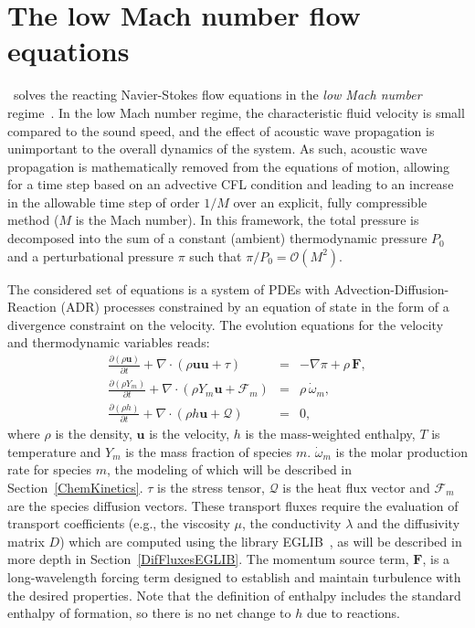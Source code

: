 \section{The low Mach number flow equations}
\newcommand{\etal}{{\it et al.}}

\pelelm\ solves the reacting Navier-Stokes flow equations in the \emph{low Mach number} regime~\cite{DayBell:2000,rehm1978equations,Majda:1985}. In the low Mach number regime, the characteristic fluid velocity is small compared to the sound speed, and the effect of acoustic wave propagation is unimportant to the overall dynamics of the system. As such, acoustic wave propagation is mathematically removed from the equations of motion, allowing for a time step based on an advective CFL condition and leading to an increase in the allowable time step of order $1/M$ over an explicit, fully compressible method ($M$ is the Mach number). In this framework, the total pressure is decomposed into the sum of a constant (ambient) thermodynamic pressure $P_0$ and a perturbational pressure $\pi$ such that $\pi/P_0 = \mathcal{O} (M^2)$. 

The considered set of equations is a system of PDEs with Advection-Diffusion-Reaction (ADR) processes constrained by an equation of state in the form of a divergence constraint on the velocity. The evolution equations for the velocity and thermodynamic variables reads:
\begin{eqnarray}
\frac{\partial (\rho \boldsymbol{u})}{\partial t} + 
\nabla \cdot \left(\rho  \boldsymbol{u} \boldsymbol{u} + \tau \right)
&=& -\nabla \pi + \rho \, \boldsymbol{F}  ,
\label{eq:mom}
\\
\frac{\partial (\rho Y_m)}{\partial t} +
\nabla \cdot \left( \rho Y_m \boldsymbol{u} + \boldsymbol{\mathcal{F}}_{m} \right)
&=& \rho \, \dot{\omega}_m,
\label{eq:species}
\\
\frac{ \partial (\rho h)}{ \partial t} +
\nabla \cdot \left( \rho h \boldsymbol{u} + \boldsymbol{\mathcal{Q}} \right) &=& 0 ,
\label{eq:enthalpy}
\end{eqnarray}
where $\rho$ is the density, $\boldsymbol{u}$ is the velocity, $h$ is the mass-weighted enthalpy, $T$ is temperature and $Y_m$ is the mass fraction of species $m$. $\dot{\omega}_m$ is the molar production rate for species $m$, the modeling of which will be described in Section~\ref{ChemKinetics}. $\tau$ is the stress tensor, $\boldsymbol{\mathcal{Q}}$ is the heat flux vector and $\boldsymbol{\mathcal{F}}_m$
are the species diffusion vectors. These transport fluxes require the evaluation of transport coefficients (e.g., the viscosity $\mu$, the conductivity $\lambda$ and the diffusivity matrix $D$) which are computed using the library EGLIB~\cite{EGLIB}, as will be described in more depth in Section~\ref{DifFluxesEGLIB}. The momentum source term, $\boldsymbol{F}$, is a long-wavelength forcing term designed to establish and maintain turbulence with the desired properties. Note that the definition of enthalpy includes the standard enthalpy of formation, so there is no net change to $h$ due to reactions.

